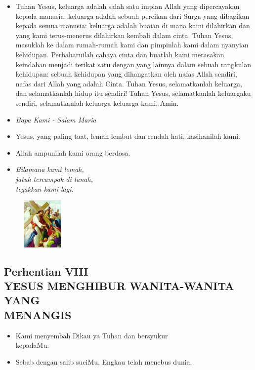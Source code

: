 \documentclass[a5paper,headsepline,titlepage,10pt,nnormalheadings,DIVcalc]{scrbook}
\newcommand{\BU}[1]{\begin{itemize} \item[U:] #1 \end{itemize}}
\newcommand{\BP}[1]{\begin{itemize} \item[P:] #1 \end{itemize}}
\newcommand{\kamiMenyembah}{\BP{ Kami menyembah Dikau ya Tuhan dan bersyukur\\kepadaMu.}
\BU{ Sebab dengan salib suciMu, Engkau telah menebus dunia.}
}
\newcommand{\kasihanilahKami}{\BP{Yesus, yang paling taat, lemah lembut dan rendah hati, kasihanilah kami.}
\BU{Allah ampunilah kami orang berdosa.}}
\begin{document}
\BU{Tuhan Yesus, keluarga adalah salah satu impian Allah yang dipercayakan kepada manusia; keluarga adalah sebuah percikan dari Surga yang dibagikan kepada semua manusia: keluarga adalah buaian di mana kami dilahirkan dan yang kami terus-menerus dilahirkan kembali dalam cinta. Tuhan Yesus, masuklah ke dalam rumah-rumah kami dan pimpinlah kami dalam nyanyian kehidupan. Perbaharuilah cahaya cinta dan buatlah kami merasakan keindahan menjadi terikat satu dengan yang lainnya dalam sebuah rangkulan kehidupan: sebuah kehidupan yang dihangatkan oleh nafas Allah sendiri, nafas dari Allah yang adalah Cinta. Tuhan Yesus, selamatkanlah keluarga, dan selamatkanlah hidup itu sendiri! Tuhan Yesus, selamatkanlah keluargaku sendiri, selamatkanlah keluarga-keluarga kami, Amin.
}

\large\begin{itemize}\item[~]\it{Bapa Kami - Salam Maria}\end{itemize}\normalsize
\kasihanilahKami

\begin{itemize}
\item[8.] \it{Bilamana kami lemah,\\
	 jatuh tercampak di tanah,\\ 
	tegakkan kami lagi.}
\end{itemize}

\begin{figure}
\includegraphics[width=2cm]{jalansalib_files/08_small.jpg}
\end{figure}
\subsection*{Perhentian VIII\\
YESUS MENGHIBUR WANITA-WANITA YANG\\MENANGIS}
\kamiMenyembah
\end{document}
